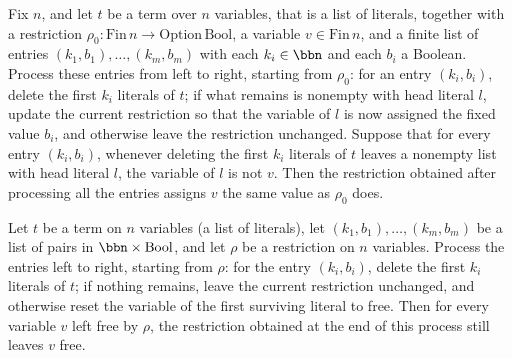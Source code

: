 \begin{lemma}
\label{SwitchingLemma.foldl_rho_stable}
\leanok
{}
Fix $n$, and let $t$ be a term over $n$ variables, that is a list of literals, together
with a restriction $\rho_0 : \mathrm{Fin}\,n \to \mathrm{Option}\,\mathrm{Bool}$, a
variable $v \in \mathrm{Fin}\,n$, and a finite list of entries $(k_1, b_1), \dots, (k_m,
b_m)$ with each $k_i \in \bbn$ and each $b_i$ a Boolean. Process these entries from left
to right, starting from $\rho_0$: for an entry $(k_i, b_i)$, delete the first $k_i$
literals of $t$; if what remains is nonempty with head literal $l$, update the current
restriction so that the variable of $l$ is now assigned the fixed value $b_i$, and
otherwise leave the restriction unchanged. Suppose that for every entry $(k_i, b_i)$,
whenever deleting the first $k_i$ literals of $t$ leaves a nonempty list with head
literal $l$, the variable of $l$ is not $v$. Then the restriction obtained after
processing all the entries assigns $v$ the same value as $\rho_0$ does.
\end{lemma}

\begin{lemma}
\label{SwitchingLemma.foldl_sigma_preserves_none}
\leanok
{}
Let $t$ be a term on $n$ variables (a list of literals), let $(k_1,b_1),\dots,(k_m,b_m)$
be a list of pairs in $\bbn\times\mathrm{Bool}$, and let $\rho$ be a restriction on $n$
variables. Process the entries left to right, starting from $\rho$: for the entry
$(k_i,b_i)$, delete the first $k_i$ literals of $t$; if nothing remains, leave the
current restriction unchanged, and otherwise reset the variable of the first surviving
literal to free. Then for every variable $v$ left free by $\rho$, the restriction
obtained at the end of this process still leaves $v$ free.
\end{lemma}


